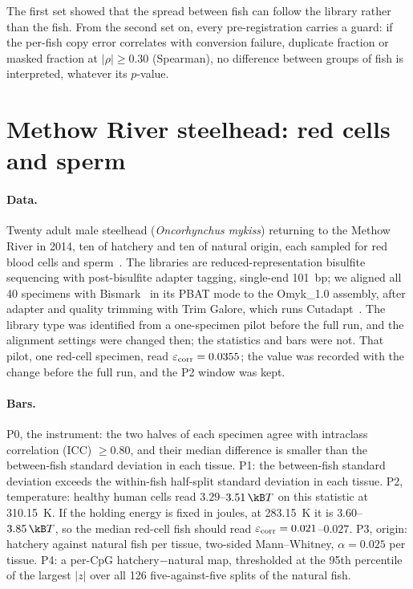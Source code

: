 The first set showed that the spread between fish can follow the library rather than the fish. From the second set on, every
pre-registration carries a guard: if the per-fish copy error correlates with conversion failure, duplicate fraction or masked
fraction at $|\rho|\ge0.30$ (Spearman), no difference between groups of fish is interpreted, whatever its $p$-value.

\section{Methow River steelhead: red cells and sperm}

\paragraph{Data.} Twenty adult male steelhead (\emph{Oncorhynchus mykiss}) returning to the Methow River in 2014, ten of hatchery
and ten of natural origin, each sampled for red blood cells and sperm~\cite{Gavery2018}. The libraries are reduced-representation
bisulfite sequencing with post-bisulfite adapter tagging, single-end 101~bp; we aligned all 40 specimens with
Bismark~\cite{Krueger2011} in its PBAT mode to the Omyk\_1.0 assembly, after adapter and quality trimming with Trim Galore, which
runs Cutadapt~\cite{Martin2011}. The library type was identified from a one-specimen pilot before the full run, and the alignment
settings were changed then; the statistics and bars were not. That pilot, one red-cell specimen, read
$\varepsilon_{\rm corr}=0.0355$; the value was recorded with the change before the full run, and the P2 window was kept.

\paragraph{Bars.} P0, the instrument: the two halves of each specimen agree with intraclass correlation (ICC) $\ge0.80$, and their
median difference is smaller than the between-fish standard deviation in each tissue. P1: the between-fish standard deviation
exceeds the within-fish half-split standard deviation in each tissue. P2, temperature: healthy human cells read
$3.29$--$3.51\,\kB T$ on this statistic at 310.15~K. If the holding energy is fixed in joules, at 283.15~K it is
$3.60$--$3.85\,\kB T$, so the median red-cell fish should read $\varepsilon_{\rm corr}=0.021$--$0.027$. P3, origin: hatchery
against natural fish per tissue, two-sided Mann--Whitney, $\alpha=0.025$ per tissue. P4: a per-CpG hatchery$-$natural map,
thresholded at the 95th percentile of the largest $|z|$ over all 126 five-against-five splits of the natural fish.

